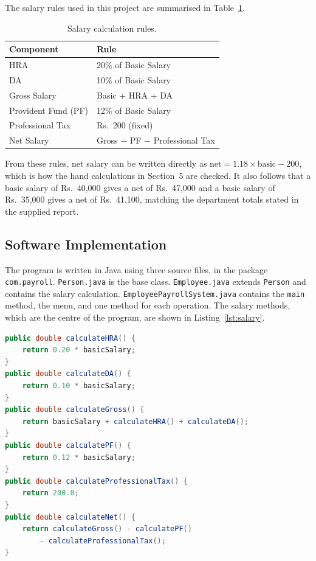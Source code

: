 \documentclass[11pt,a4paper]{article}
\begin{document}
The salary rules used in this project are summarised in
Table~\ref{tab:rules}.

\begin{table}[h]
\centering
\caption{Salary calculation rules.}
\label{tab:rules}
\begin{tabular}{ll}
\toprule
\textbf{Component} & \textbf{Rule} \\
\midrule
HRA & 20\% of Basic Salary \\
DA & 10\% of Basic Salary \\
Gross Salary & Basic + HRA + DA \\
Provident Fund (PF) & 12\% of Basic Salary \\
Professional Tax & Rs.~200 (fixed) \\
Net Salary & Gross $-$ PF $-$ Professional Tax \\
\bottomrule
\end{tabular}
\end{table}

From these rules, net salary can be written directly as
$\text{net} = 1.18 \times \text{basic} - 200$, which is how the
hand calculations in Section~5 are checked. It also follows that a
basic salary of Rs.~40,000 gives a net of Rs.~47,000 and a basic
salary of Rs.~35,000 gives a net of Rs.~41,100, matching the
department totals stated in the supplied report.

\subsection{Software Implementation}

The program is written in Java using three source files, in the
package \texttt{com.payroll}. \texttt{Person.java} is the base
class. \texttt{Employee.java} extends \texttt{Person} and contains
the salary calculation. \texttt{EmployeePayroll\-System.java}
contains the \texttt{main} method, the menu, and one method for
each operation. The salary methods, which are the centre of the program,
are shown in Listing~\ref{lst:salary}.

\begin{lstlisting}[language=Java, caption={Salary calculation in Employee.java.}, label={lst:salary}]
public double calculateHRA() {
    return 0.20 * basicSalary;
}
public double calculateDA() {
    return 0.10 * basicSalary;
}
public double calculateGross() {
    return basicSalary + calculateHRA() + calculateDA();
}
public double calculatePF() {
    return 0.12 * basicSalary;
}
public double calculateProfessionalTax() {
    return 200.0;
}
public double calculateNet() {
    return calculateGross() - calculatePF()
        - calculateProfessionalTax();
}
\end{lstlisting}
\end{document}
